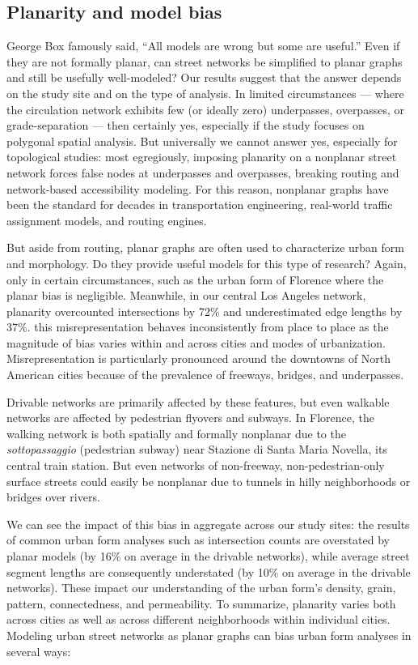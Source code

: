 \documentclass[Afour,sageh,times]{sagej}
\begin{document}
\subsection{Planarity and model bias}

George Box famously said, \enquote{All models are wrong but some are useful.} Even if they are not formally planar, can street networks be simplified to planar graphs and still be usefully well-modeled? Our results suggest that the answer depends on the study site and on the type of analysis. In limited circumstances --- where the circulation network exhibits few (or ideally zero) underpasses, overpasses, or grade-separation --- then certainly yes, especially if the study focuses on polygonal spatial analysis. But universally we cannot answer yes, especially for topological studies: most egregiously, imposing planarity on a nonplanar street network forces false nodes at underpasses and overpasses, breaking routing and network-based accessibility modeling. For this reason, nonplanar graphs have been the standard for decades in transportation engineering, real-world traffic assignment models, and routing engines.

But aside from routing, planar graphs are often used to characterize urban form and morphology. Do they provide useful models for this type of research? Again, only in certain circumstances, such as the urban form of Florence where the planar bias is negligible. Meanwhile, in our central Los Angeles network, planarity overcounted intersections by 72\% and underestimated edge lengths by 37\%. this misrepresentation behaves inconsistently from place to place as the magnitude of bias varies within and across cities and modes of urbanization. Misrepresentation is particularly pronounced around the downtowns of North American cities because of the prevalence of freeways, bridges, and underpasses.

Drivable networks are primarily affected by these features, but even walkable networks are affected by pedestrian flyovers and subways. In Florence, the walking network is both spatially and formally nonplanar due to the \textit{sottopassaggio} (pedestrian subway) near Stazione di Santa Maria Novella, its central train station. But even networks of non-freeway, non-pedestrian-only surface streets could easily be nonplanar due to tunnels in hilly neighborhoods or bridges over rivers.

We can see the impact of this bias in aggregate across our study sites: the results of common urban form analyses such as intersection counts are overstated by planar models (by 16\% on average in the drivable networks), while average street segment lengths are consequently understated (by 10\% on average in the drivable networks). These impact our understanding of the urban form's density, grain, pattern, connectedness, and permeability. To summarize, planarity varies both across cities as well as across different neighborhoods within individual cities. Modeling urban street networks as planar graphs can bias urban form analyses in several ways:
\end{document}
